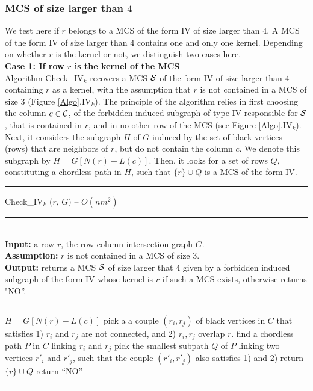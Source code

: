 \documentclass{article}
\begin{document}
\subsubsection{MCS of size larger than $4$}

We test here if $r$ belongs to a MCS of the form IV of size larger than $4$.
A MCS of the form IV of size larger than $4$ contains one and only
one kernel. Depending on whether $r$ is the kernel or not, we
distinguish two cases here.\\

{\bf Case 1: If row $r$ is the kernel of the MCS}\\

Algorithm \mbox{Check\_IV$_k$} recovers a MCS ${\cal S}$ of the form IV of size 
larger than $4$ containing $r$ as a kernel, with the assumption that  $r$ 
is not contained in a MCS of size $3$ (Figure \ref{Algo}.IV$_k$).
The principle of the algorithm relies in first choosing the column 
$c\in {\cal C}$, of the
forbidden induced subgraph of type IV responsible for ${\cal S}$, that is 
contained in $r$, and in no other row of the MCS  
(see Figure \ref{Algo}.IV$_k$).
Next, it considers the subgraph $H$ of $G$ induced by the set of black 
vertices (rows) that are neighbors of $r$, but do not contain the column $c$.
We denote this subgraph by  $H = G[N(r)-L(c)]$.
Then, it looks for a set of rows $Q$, constituting a chordless path in $H$, 
such that $\{r\}\cup Q$ is a MCS of the form IV.


\begin{algorithm}[htpb]                      
\rule{11.7cm}{0.01cm}

\caption{Check\_IV$_k$ ($r$, $G$) -- $O(nm^2)$} 
\rule{11.7cm}{0.01cm}
\\
{\bf Input:} a row $r$, the row-column intersection graph $G$.\\
{\bf Assumption:}  $r$ is not contained in a MCS of size $3$.\\
{\bf Output:} returns a MCS ${\cal S}$ of size larger that $4$ given by a 
forbidden induced subgraph of the form IV whose kernel is $r$ if such a 
MCS exists, otherwise returns  "NO''.
\rule{11.7cm}{0.01cm}

\begin{algorithmic}[1]
\STATE $H = G[N(r)-L(c)]$
\STATE pick a a couple $(r_i,r_j)$ of black vertices in $C $ that satisfies 
1) $r_i$ and $r_j$ are not connected, and 2) $r_i,r_j$  overlap $r$.
\STATE find a chordless path $P$ in $C$ linking $r_i$ and $r_j$
\STATE pick the smallest subpath $Q$ of $P$ linking two vertices $r'_i$ and 
$r'_j$, such that the couple $(r'_i,r'_j)$ also satisfies 1) and 2)
\STATE return $\{r\}\cup Q$
\ENDFOR
\ENDFOR
\STATE return ``NO''
\end{algorithmic}
\rule{11.7cm}{0.01cm}
\end{algorithm}
\end{document}
